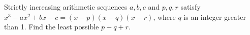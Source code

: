 Strictly increasing arithmetic sequences $a,b,c$ and $p,q,r$ satisfy $x^3-ax^2+bx-c=(x-p)(x-q)(x-r)$, where $q$ is an integer greater than 1. Find the least possible $p+q+r$.
